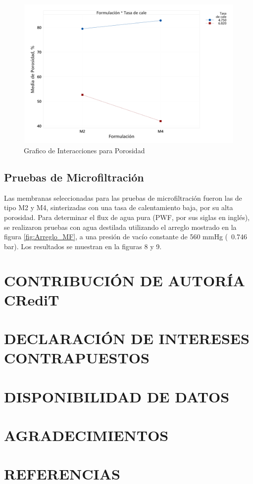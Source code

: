 \documentclass{article}
\begin{document}
\begin{figure}[ht]
    \centering
    \includegraphics[width=0.7\linewidth]{Graphics/Grafico de interacciones de Porosidad.png}
    \caption{Grafico de Interacciones para Porosidad}
    \label{fig:InteractPorosidad}
\end{figure}

\subsection{Pruebas de Microfiltración}

Las membranas seleccionadas para las pruebas de microfiltración 
fueron las de tipo M2 y M4, sinterizadas con una tasa de 
calentamiento baja, por su alta porosidad. 
Para determinar el flux de agua pura 
(PWF, por sus siglas en inglés), se realizaron pruebas con 
agua destilada utilizando el arreglo mostrado en la 
figura \ref{fig:Arreglo_MF}, a una presión de vacío constante 
de 560 mmHg (~0.746 bar). Los resultados se muestran en la 
figuras 8 y 9. 


\newpage
\section{CONTRIBUCIÓN DE AUTORÍA CRediT}

\section{DECLARACIÓN DE INTERESES CONTRAPUESTOS}

\section{DISPONIBILIDAD DE DATOS}

\section{AGRADECIMIENTOS}

\section{REFERENCIAS}

\printbibliography
\end{document}
